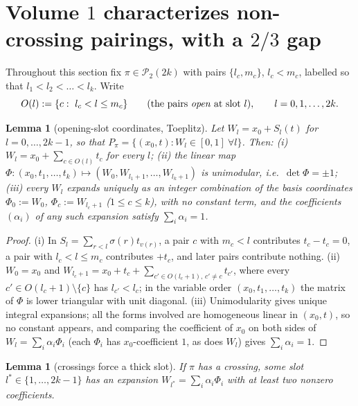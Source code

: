 ﻿\documentclass[11pt]{article}
\newtheorem{lemma}[theorem]{Lemma}
\theoremstyle{remark}
\newcommand{\PP}{\mathcal{P}_2}
\begin{document}
\section{Volume $1$ characterizes non-crossing pairings, with a $2/3$ gap}

Throughout this section fix $\pi\in\PP(2k)$ with pairs $\{l_c,m_c\}$, $l_c<m_c$,
labelled so that $l_1<l_2<\dots<l_k$. Write
\[
O(l):=\{c:\ l_c<l\le m_c\}\qquad\text{(the pairs \emph{open} at slot $l$)},
\qquad l=0,1,\dots,2k .
\]

\begin{lemma}[opening-slot coordinates, Toeplitz]\label{lem:coords}
Let $W_l=x_0+S_l(t)$ for $l=0,\dots,2k-1$, so that
$P_\pi=\{(x_0,t):W_l\in[0,1]\ \forall l\}$. Then:
(i) $W_l=x_0+\sum_{c\in O(l)}t_c$ for every $l$;
(ii) the linear map $\Phi:(x_0,t_1,\dots,t_k)\mapsto(W_0,W_{l_1+1},\dots,W_{l_k+1})$
is unimodular, i.e.\ $\det\Phi=\pm1$;
(iii) every $W_l$ expands uniquely as an integer combination of the \emph{basis}
coordinates $\Phi_0:=W_0$, $\Phi_c:=W_{l_c+1}$ ($1\le c\le k$), with no constant
term, and the coefficients $(\alpha_i)$ of any such expansion satisfy
$\sum_i\alpha_i=1$.
\end{lemma}

\begin{proof}
(i) In $S_l=\sum_{r<l}\sigma(r)t_{v(r)}$, a pair $c$ with $m_c<l$ contributes
$t_c-t_c=0$, a pair with $l_c<l\le m_c$ contributes $+t_c$, and later pairs
contribute nothing. (ii) $W_0=x_0$ and
$W_{l_c+1}=x_0+t_c+\sum_{c'\in O(l_c+1),\,c'\neq c}t_{c'}$, where every
$c'\in O(l_c+1)\setminus\{c\}$ has $l_{c'}<l_c$; in the variable order
$(x_0,t_1,\dots,t_k)$ the matrix of $\Phi$ is lower triangular with unit diagonal.
(iii) Unimodularity gives unique integral expansions; all the forms involved are
homogeneous linear in $(x_0,t)$, so no constant appears, and comparing the
coefficient of $x_0$ on both sides of $W_l=\sum_i\alpha_i\Phi_i$ (each $\Phi_i$ has
$x_0$-coefficient $1$, as does $W_l$) gives $\sum_i\alpha_i=1$.
\end{proof}

\begin{lemma}[crossings force a thick slot]\label{lem:thick}
If $\pi$ has a crossing, some slot $l^*\in\{1,\dots,2k-1\}$ has an expansion
$W_{l^*}=\sum_i\alpha_i\Phi_i$ with at least two nonzero coefficients.
\end{lemma}
\end{document}
